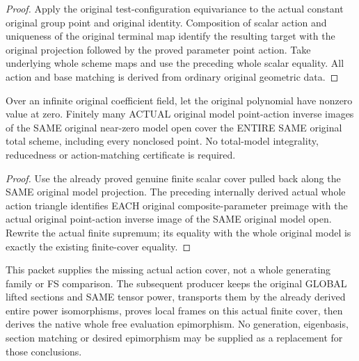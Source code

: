 \begin{proof}
Apply the original test-configuration equivariance to the actual constant
original group point and original identity. Composition of scalar action
and uniqueness of the original terminal map identify the resulting target
with the original projection followed by the proved parameter point action.
Take underlying whole scheme maps and use the preceding whole scalar equality.
All action and base matching is derived from ordinary original geometric data.
\end{proof}
\begin{theorem}
\label{thm:central-embedding-original-entire-model-finite-group-point-cover}
\leanok
Over an infinite original coefficient field, let the original polynomial
have nonzero value at zero. Finitely many ACTUAL original model point-action
inverse images of the SAME original near-zero model open cover the ENTIRE
SAME original total scheme, including every nonclosed point. No total-model
integrality, reducedness or action-matching certificate is required.
\end{theorem}
\begin{proof}
Use the already proved genuine finite scalar cover pulled back along the
SAME original model projection. The preceding internally derived actual
whole action triangle identifies EACH original composite-parameter preimage
with the actual original point-action inverse image of the SAME original
model open. Rewrite the actual finite supremum; its equality with the whole
original model is exactly the existing finite-cover equality.
\end{proof}
This packet supplies the missing actual action cover, not a whole generating
family or FS comparison. The subsequent producer keeps the original GLOBAL
lifted sections and SAME tensor power, transports them by the already derived
entire power isomorphisms, proves local frames on this actual finite cover,
then derives the native whole free evaluation epimorphism. No generation,
eigenbasis, section matching or desired epimorphism may be supplied as a
replacement for those conclusions.
